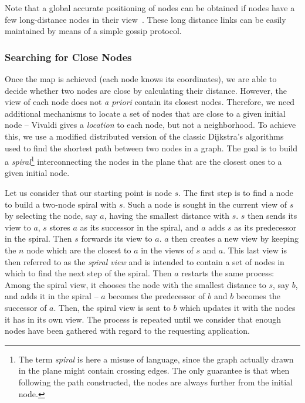 \newpage

Note that a global accurate positioning of nodes can be
obtained if nodes have a few long-distance nodes in their
view~\cite{dabek:2001:sigcomm04}. These long distance links can be easily
maintained by means of a simple gossip protocol.

\subsubsection*{Searching for Close Nodes}

Once the map is achieved (each node knows its coordinates), we are able to decide
whether two nodes are close by calculating their distance. However, the view of
each node does not \emph{a priori} contain its closest nodes. Therefore, we need additional
mechanisms to locate a set of nodes that are close to a given initial node --
Vivaldi gives a \emph{location} to each node, but not a neighborhood. To achieve
this, we use a modified distributed version of the classic Dijkstra's algorithms
used to find the shortest path between two nodes in a graph. The goal is to
build a \emph{spiral}\footnote{The term \emph{spiral} is here a misuse of
language, since the graph actually drawn in the plane
might contain crossing edges. The only guarantee is that when following the
path constructed, the nodes are always further from the initial node.}
interconnecting the nodes in the plane that are the closest ones to a given initial
node.

Let us consider that our starting point is node $s$. The first step is to find
a node to build a two-node spiral with $s$. Such a node is sought in the current
view of $s$ by selecting the node, say $a$, having the smallest distance with
$s$. $s$ then sends its view to $a$, $s$ stores $a$ as its
successor in the spiral, and $a$ adds $s$ as its predecessor in the spiral. Then
$s$ forwards its view to $a$. $a$ then creates a new view by keeping the $n$
node which are the closest to $a$ in the views of $s$ and $a$. This last view is
then referred to as the \emph{spiral view} and is intended to contain a set of
nodes in which to find the next step of the spiral. Then $a$ restarts the same
process: Among the spiral view, it chooses the node with the smallest distance
to $s$, say $b$, and adds it in the spiral -- $a$ becomes the predecessor of $b$
and $b$ becomes the successor of $a$. Then, the spiral view is sent to $b$ which
updates it with the nodes it has in its own view. The process is repeated until
we consider that enough nodes have been gathered with regard to the requesting
application.

